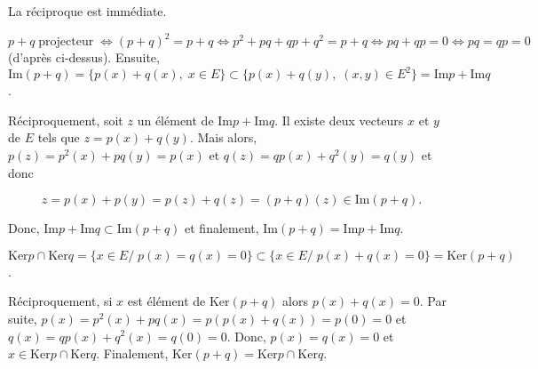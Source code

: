{\begin{enumerate}
{La réciproque est immédiate.

$p+q\;\mbox{projecteur}\;\Leftrightarrow(p+q)^2=p+q\Leftrightarrow p^2+pq+qp+q^2=p+q\Leftrightarrow pq+qp= 0\Leftrightarrow pq=qp=0$ (d'après ci-dessus).
Ensuite, $\mbox{Im}(p+q)=\{p(x)+q(x),\;x\in E\}\subset\{p(x)+q(y),\;(x,y)\in E^2\}=\mbox{Im}p+\mbox{Im}q$.

Réciproquement, soit $z$ un élément de $\mbox{Im}p+\mbox{Im}q$. Il existe deux vecteurs $x$ et $y$ de $E$ tels que
$z=p(x)+q(y)$. Mais alors, $p(z)=p^2(x)+pq(y)=p(x)$ et $q(z)=qp(x)+q^2(y)=q(y)$ et donc

$$z=p(x)+p(y)=p(z)+q(z)=(p+q)(z)\in\mbox{Im}(p+q).$$

Donc, $\mbox{Im}p+\mbox{Im}q\subset\mbox{Im}(p+q)$ et finalement, $\mbox{Im}(p+q)=\mbox{Im}p+\mbox{Im}q$.

$\mbox{Ker}p\cap\mbox{Ker}q=\{x\in E/\;p(x)=q(x)=0\}\subset\{x\in E/\;p(x)+q(x)=0\}=\mbox{Ker}(p+q)$.

Réciproquement, si $x$ est élément de $\mbox{Ker}(p+q)$ alors $p(x)+q(x)=0$. Par suite,
$p(x)=p^2(x)+pq(x)=p(p(x)+q(x))=p(0)=0$ et $q(x)=qp(x)+q^2(x)=q(0)=0$. Donc, $p(x)=q(x)=0$ et
$x\in\mbox{Ker}p\cap\mbox{Ker}q$. Finalement, $\mbox{Ker}(p+q)=\mbox{Ker}p\cap\mbox{Ker}q$.}
\end{enumerate}
}
